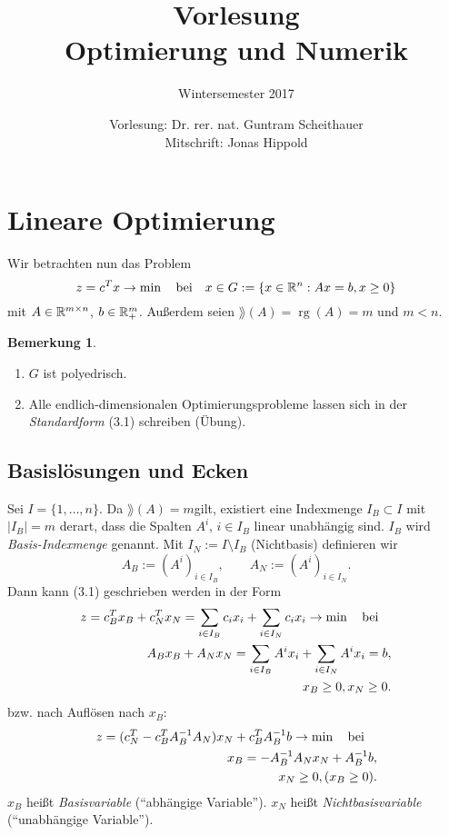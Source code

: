 \documentclass[
 a4paper,
 12pt,
 parskip=half
 ]{scrartcl}
\title{Vorlesung\\Optimierung und Numerik}
\subtitle{Wintersemester 2017}
\author{Vorlesung: Dr. rer. nat. Guntram Scheithauer\\Mitschrift: Jonas Hippold}
\theoremstyle{plain}
\theoremstyle{definition}
\newtheorem{rmrk}{Bemerkung}
\numberwithin{rmrk}{section}
\numberwithin{defn}{section}
\numberwithin{exmp}{section}
\numberwithin{equation}{section}
\begin{document}
\maketitle

\tableofcontents

\clearpage



\clearpage



\clearpage

\section{Lineare Optimierung}
Wir betrachten nun das Problem
\begin{equation}
  z = c^T x \to \min \quad \text{bei} \quad x \in G := \{x \in \mathbb{R}^n : Ax = b, x \ge 0 \}
\end{equation}
mit $A \in \mathbb{R}^{m \times n}$, $b \in \mathbb{R}^m_+$. Außerdem seien $\rang(A) =
\operatorname{rg}(A) = m$ und $m < n$.

\begin{rmrk}
  \begin{enumerate}[(1)]
  \item $G$ ist polyedrisch.
  \item Alle endlich-dimensionalen Optimierungsprobleme lassen sich in der
    \emph{Standardform} (3.1) schreiben (Übung).
  \end{enumerate}
\end{rmrk}

\subsection{Basislösungen und Ecken}
Sei $I = \{1, \ldots, n \}$. Da $\rang(A) = m$gilt, existiert eine Indexmenge
$I_B \subset I$ mit $|I_B| = m$ derart, dass die Spalten $A^i$, $i \in I_B$
linear unabhängig sind. $I_B$ wird \emph{Basis-Indexmenge} genannt. Mit $I_N :=
I \setminus I_B$ (Nichtbasis) definieren wir
\[ A_B := (A^i)_{i \in I_B}, \qquad A_N := (A^i)_{i \in I_N}. \]
Dann kann (3.1) geschrieben werden in der Form
\begin{equation}
  \begin{aligned}
    z = c_B^T x_B + c_N^T x_N = \sum_{i \in I_B} c_i x_i + \sum_{i \in I_N} c_i
    x_i \to \min \quad \text{bei} \quad \\
    A_B x_B + A_N x_N = \sum_{i \in I_B} A^i x_i + \sum_{i \in I_N} A^i x_i = b, \\
    x_B \ge 0, x_N \ge 0.
  \end{aligned}
\end{equation}
bzw. nach Auflösen nach $x_B$:
\begin{equation}
  \begin{aligned}
    z = (c_N^T - c_B^T A_B^{-1} A_N) x_N + c_B^T A_B^{-1} b \to \min
    \quad \text{bei} \quad \\
    x_B = -A_B^{-1} A_N x_N + A_B^{-1} b, \\
    x_N \ge 0, (x_B \ge 0).
  \end{aligned}
\end{equation}
$x_B$ heißt \emph{Basisvariable} (``abhängige Variable''). $x_N$ heißt
\emph{Nichtbasisvariable} (``unabhängige Variable'').
\end{document}
